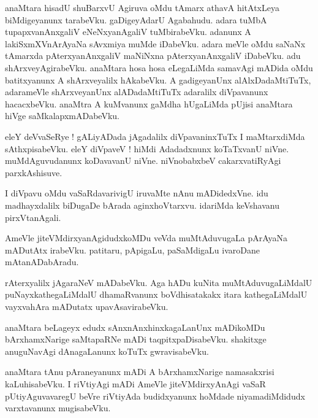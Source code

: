 \documentclass{article}
\begin{document}
\begin{mn}%
anaMtara hisadU shuBarxvU Agiruva oMdu tAmarx athavA hitAtxLeya biMdigeyanunx tarabeVku. 
gaDigeyAdarU Agabahudu. adara tuMbA tupapxvanAnxgaliV eNeNxyanAgaliV tuMbirabeVku. adanunx A 
lakiSxmXVnArAyaNa sAvxmiya muMde iDabeVku. adara meVle oMdu saNaNx tAmarxda pAterxyanAnxgaliV 
maNiNxna pAterxyanAnxgaliV iDabeVku. adu shArxveyAgirabeVku. anaMtara hosa hosa eLegaLiMda samavAgi 
mADida oMdu batitxyanunx A shArxveyalilx hAkabeVku. A gadigeyanUnx alAlxDadaMtiTuTx, adarameVle 
shArxveyanUnx alADadaMtiTuTx adaralilx diVpavanunx hacacxbeVku. anaMtra A kuMvanunx gaMdha hUgaLiMda 
pUjisi anaMtara hiVge saMkalapxmADabeVku.
\end{mn}

\begin{mn}%
eleY deVvaSeRye ! gALiyADada jAgadalilx diVpavaninxTuTx I maMtarxdiMda sAthxpisabeVku. eleY diVpaveV 
! hiMdi Adadadxnunx koTaTxvanU niVne. muMdAguvudanunx koDavavanU niVne. niVnobabxbeV 
cakarxvatiRyAgi parxkAshisuve.
\end{mn}

\begin{mn}%
I diVpavu oMdu vaSaRdavarivigU iruvaMte nAnu mADidedxVne. idu madhayxdalilx biDugaDe bArada 
aginxhoVtarxvu. idariMda keVshavanu pirxVtanAgali.
\end{mn}

\begin{mn}%
AmeVle jiteVMdirxyanAgidudxkoMDu veVda muMtAduvugaLa pArAyaNa mADutAtx irabeVku. patitaru, pApigaLu, 
paSaMdigaLu ivaroDane mAtanADabAradu.
\end{mn}

\begin{mn}%
rAterxyalilx jAgaraNeV mADabeVku. Aga hADu kuNita muMtAduvugaLiMdalU puNayxkathegaLiMdalU 
dhamaRvanunx boVdhisatakakx itara kathegaLiMdalU vayxvahAra mADutatx upavAsavirabeVku.
\end{mn}

\begin{mn}%
anaMtara beLageyx edudx sAnxnAnxhinxkagaLanUnx mADikoMDu bArxhamxNarige saMtapaRNe mADi 
taqpitxpaDisabeVku. shakitxge anuguNavAgi dAnagaLanunx koTuTx gwravisabeVku.
\end{mn}

\begin{mn}%
anaMtara tAnu pAraneyanunx mADi A bArxhamxNarige namasakxrisi kaLuhisabeVku. I riVtiyAgi mADi 
AmeVle jiteVMdirxyAnAgi vaSaR pUtiyAguvavaregU beVre riVtiyAda budidxyanunx hoMdade niyamadiMdidudx 
varxtavanunx mugisabeVku.
\end{mn}
\end{document}
